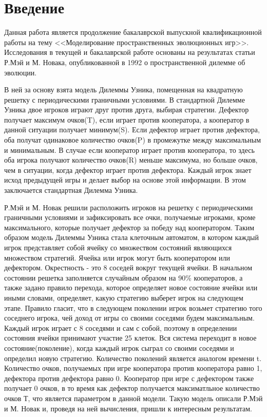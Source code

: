 \documentclass[14pt]{article}
\begin{document}
\section{Введение}
\par Данная работа является продолжение бакалаврской выпускной квалификационной работы на тему <<Моделирование пространственных эволюционных игр>>. Исследования в текущей и бакалаврской работе основаны на результатах статьи Р.Мэй и М. Новака, опубликованной в 1992 о пространственной дилемме об эволюции. \par В ней за основу взята модель Дилеммы Узника, помещенная на квадратную решетку с периодическими граничными условиями. В стандартной Дилемме Узника двое игроков играют друг против друга, выбирая стратегии. Дефектор получает максимум очков(T), если играет против кооператора, а кооператор в данной ситуации получает минимум(S). Если дефектор играет против дефектора, оба получат одинаковое количество очков(P) в промежутке между максимальным и минимальным. В случае если кооператор играет против кооператора, то здесь оба игрока получают количество очков(R) меньше максимума, но больше очков, чем в ситуации, когда дефектор играет против дефектора. Каждый игрок знает исход предыдущей игры и делает выбор на основе этой информации. В этом заключается стандартная Дилемма Узника.
\par Р.Мэй и М. Новак решили расположить игроков на решетку с периодическими граничными условиями и зафиксировать все очки, получаемые игроками, кроме максимального, которые получает дефектор за победу над кооператором. Таким образом модель Дилеммы Узника стала клеточным автоматом, в котором каждый игрок представляет собой ячейку со множеством состояний являющихся множеством стратегий. Ячейка или игрок могут быть кооператором или дефектором. Окрестность - это 8 соседей вокруг текущей ячейки. В начальном состоянии решетка заполняется случайным образом на 90\% кооператоров, а также задано правило перехода, которое определяет новое состояние ячейки или иными словами, определяет, какую стратегию выберет игрок на следующем этапе. Правило гласит, что в следующем поколении игрок возьмет стратегию того соседнего игрока, чей доход от игры со своими соседями будем максимальным. Каждый игрок играет с 8 соседями и сам с собой, поэтому в определении состояния ячейки принимают участие 25 клеток. Вся система переходит в новое состояние(поколение), когда каждый игрок сыграл со своими соседями и определил новую стратегию. Количество поколений является аналогом времени t. Количество очков, получаемых при игре кооператора против кооператора равно 1, дефектора против дефектора равно 0. Кооператор при игре с дефектором также получает 0 очков, в то время как дефектор получается максиматльное количество очков Т, что является параметром в данной модели. Такую модель описали Р.Мэй и М. Новак и, проведя на ней вычисления, пришли к интересным результатам. 
\end{document}
